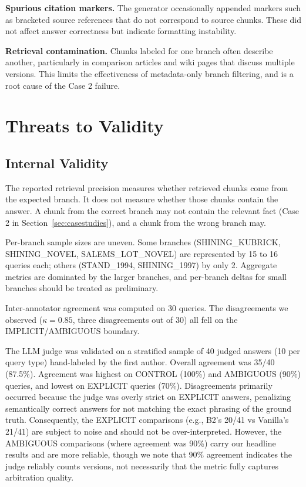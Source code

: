 \documentclass[conference]{IEEEtran}
\begin{document}
\textbf{Spurious citation markers.} The generator occasionally appended markers such as bracketed source references that do not correspond to source chunks. These did not affect answer correctness but indicate formatting instability.

\textbf{Retrieval contamination.} Chunks labeled for one branch often describe another, particularly in comparison articles and wiki pages that discuss multiple versions. This limits the effectiveness of metadata-only branch filtering, and is a root cause of the Case 2 failure.

\section{Threats to Validity}

\subsection{Internal Validity}

The reported retrieval precision measures whether retrieved chunks come from the expected branch. It does not measure whether those chunks contain the answer. A chunk from the correct branch may not contain the relevant fact (Case 2 in Section~\ref{sec:casestudies}), and a chunk from the wrong branch may.

Per-branch sample sizes are uneven. Some branches (SHINING\_KUBRICK, SHINING\_NOVEL, SALEMS\_LOT\_NOVEL) are represented by 15 to 16 queries each; others (STAND\_1994, SHINING\_1997) by only 2. Aggregate metrics are dominated by the larger branches, and per-branch deltas for small branches should be treated as preliminary.

Inter-annotator agreement was computed on 30 queries. The disagreements we observed ($\kappa = 0.85$, three disagreements out of 30) all fell on the IMPLICIT/AMBIGUOUS boundary.

The LLM judge was validated on a stratified sample of 40 judged answers (10 per query type) hand-labeled by the first author. Overall agreement was 35/40 (87.5\%). Agreement was highest on CONTROL (100\%) and AMBIGUOUS (90\%) queries, and lowest on EXPLICIT queries (70\%). Disagreements primarily occurred because the judge was overly strict on EXPLICIT answers, penalizing semantically correct answers for not matching the exact phrasing of the ground truth. Consequently, the EXPLICIT comparisons (e.g., B2's 20/41 vs Vanilla's 21/41) are subject to noise and should not be over-interpreted. However, the AMBIGUOUS comparisons (where agreement was 90\%) carry our headline results and are more reliable, though we note that 90\% agreement indicates the judge reliably counts versions, not necessarily that the metric fully captures arbitration quality.
\end{document}
